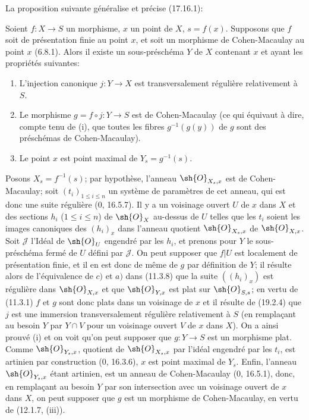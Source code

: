 La proposition suivante généralise et précise (17.16.1):

\begin{proposition}[19.2.9]
\label{IV.19.2.9}
Soient $f:X\to S$ un morphisme, $x$ un point de $X$, $s=f(x)$. Supposons que $f$ soit de présentation finie au point $x$, et soit un morphisme de Cohen-Macaulay au point $x$ (6.8.1). Alors il existe un sous-préschéma $Y$ de $X$ contenant $x$ et ayant les propriétés suivantes:
\begin{enumerate}
  \item[(i)] L'injection canonique $j:Y\to X$ est transversalement régulière relativement à $S$.
  \item[(ii)] Le morphisme $g=f\circ j:Y\to S$ est de Cohen-Macaulay (ce qui équivaut à dire, compte tenu de (i), que toutes les fibres $g^{-1}(g(y))$ de $g$ sont des préschémas de Cohen-Macaulay).
  \item[(iii)] Le point $x$ est point maximal de $Y_s=g^{-1}(s)$.
\end{enumerate}
\end{proposition}

Posons $X_s=f^{-1}(s)$; par hypothèse, l'anneau $\sh{O}_{X_s,x}$ est de Cohen-Macaulay; soit $(t_i)_{1\leq i\leq n}$ un système de paramètres de cet anneau, qui est donc une suite régulière ($0$, 16.5.7). Il y a un voisinage ouvert $U$ de $x$ dans $X$ et des sections $h_i$ ($1\leq i\leq n$) de $\sh{O}_X$ au-dessus de $U$ telles que les $t_i$ soient les images canoniques des $(h_i)_x$ dans l'anneau quotient $\sh{O}_{X_s,x}$ de $\sh{O}_{X,x}$. Soit $\mathscr J$ l'Idéal de $\sh{O}_U$ engendré par les $h_i$, et prenons pour $Y$ le sous-préschéma fermé de $U$ défini par $\mathscr J$. On peut supposer que $f|U$ est localement de présentation finie, et il en est donc de même de $g$ par définition de $Y$; il résulte alors de l'équivalence de $c)$ et $a)$ dans (11.3.8) que la suite $((h_i)_x)$ est régulière dans $\sh{O}_{X,x}$ et que $\sh{O}_{Y,x}$ est plat sur $\sh{O}_{S,s}$; en vertu de (11.3.1) $f$ et $g$ sont donc plats dans un voisinage de $x$ et il résulte de (19.2.4) que $j$ est une immersion transversalement régulière relativement à $S$ (en remplaçant au besoin $Y$ par $Y\cap V$ pour un voisinage ouvert $V$ de $x$ dans $X$). On a ainsi prouvé (i) et on voit qu'on peut supposer que $g:Y\to S$ est un morphisme plat. Comme $\sh{O}_{Y_s,x}$, quotient de $\sh{O}_{X_s,x}$ par l'idéal engendré par les $t_i$, est artinien par construction ($0$, 16.3.6), $x$ est point maximal de $Y_s$. Enfin, l'anneau $\sh{O}_{Y_s,x}$ étant artinien, est un anneau de Cohen-Macaulay ($0$, 16.5.1), donc, en remplaçant au besoin $Y$ par son intersection avec un voisinage ouvert de $x$ dans $X$, on peut supposer que $g$ est un morphisme de Cohen-Macaulay, en vertu de (12.1.7, (iii)).

